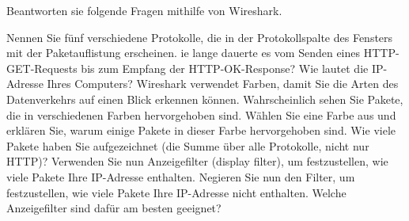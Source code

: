 \Aufgabenstellung%
Beantworten sie folgende Fragen mithilfe von Wireshark.

\Teilaufgabe%
Nennen Sie fünf verschiedene Protokolle, die in der Protokollspalte des Fensters
mit der Paketauflistung erscheinen.
\Teilaufgabe%
ie lange dauerte es vom Senden eines HTTP-GET-Requests bis zum Empfang
der HTTP-OK-Response?
\Teilaufgabe%
Wie lautet die IP-Adresse Ihres Computers?
\Teilaufgabe%
Wireshark verwendet Farben, damit Sie die Arten des Datenverkehrs auf einen
Blick erkennen können. Wahrscheinlich sehen Sie Pakete, die in verschiedenen
Farben hervorgehoben sind. Wählen Sie eine Farbe aus und erklären Sie, warum
einige Pakete in dieser Farbe hervorgehoben sind.
\Teilaufgabe%
Wie viele Pakete haben Sie aufgezeichnet (die Summe über alle Protokolle, nicht
nur HTTP)? Verwenden Sie nun Anzeigefilter (display filter), um festzustellen, wie
viele Pakete Ihre IP-Adresse enthalten.
\Teilaufgabe%
Negieren Sie nun den Filter, um festzustellen, wie viele Pakete Ihre IP-Adresse
nicht enthalten. Welche Anzeigefilter sind dafür am besten geeignet?